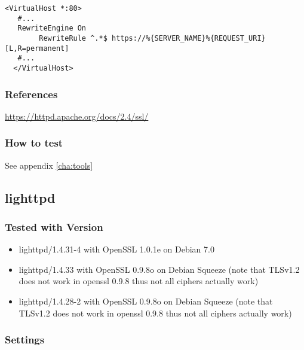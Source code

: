 \begin{lstlisting}[breaklines]
  <VirtualHost *:80>
   #...
   RewriteEngine On
        RewriteRule ^.*$ https://%{SERVER_NAME}%{REQUEST_URI} [L,R=permanent]
   #...
  </VirtualHost>
\end{lstlisting}


\subsubsection{References}
\url{https://httpd.apache.org/docs/2.4/ssl/}


\subsubsection{How to test}

See appendix \ref{cha:tools}



\subsection{lighttpd}



\subsubsection{Tested with Version}
\begin{itemize}
\item lighttpd/1.4.31-4 with OpenSSL 1.0.1e on Debian 7.0
\item lighttpd/1.4.33 with OpenSSL 0.9.8o on Debian Squeeze (note that TLSv1.2 does not work in openssl 0.9.8 thus not all ciphers actually work)
\item lighttpd/1.4.28-2 with OpenSSL 0.9.8o on Debian Squeeze (note that TLSv1.2 does not work in openssl 0.9.8 thus not all ciphers actually work)
\end{itemize}


\subsubsection{Settings}



